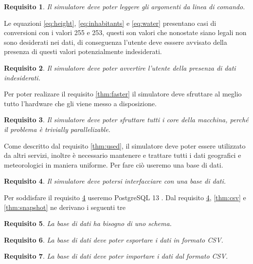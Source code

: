 \documentclass[draft]{article}
\newcommand{\eng}[1]{\foreignlanguage{english}{#1}} %
\newtheorem{requirement}{Requisito}
\begin{document}
\begin{requirement}
Il simulatore deve poter leggere gli argomenti da linea di comando.
\end{requirement}

Le equazioni \ref{eq:height}, \ref{eq:inhabitants} e \ref{eq:water} presentano
casi di conversioni con i valori 255 e 253, questi son valori che nonostate
siano legali non sono desiderati nei dati, di conseguenza l'utente deve esssere
avvisato della presenza di questi valori potenzialmente indesiderati.

\begin{requirement}
Il simulatore deve poter avvertire l'utente della presenza di dati indesiderati.
\end{requirement}

Per poter realizare il requisito \ref{thm:faster} il simulatore deve sfruttare
al meglio tutto l'\eng{hardware} che gli viene messo a disposizione.

\begin{requirement}\label{thm:multicore}
Il simulatore deve poter sfruttare tutti i \eng{core} della macchina, perché il
problema è \eng{trivially parallelizable}.
\end{requirement}

Come descritto dal requisito \ref{thm:used}, il simulatore deve poter essere
utilizzato da altri servizi, inoltre è necessario mantenere e trattare tutti i
dati geografici e meteorologici in maniera uniforme. Per fare ciò useremo una
base di dati.

\begin{requirement}\label{thm:db}
Il simulatore deve potersi interfacciare con una base di dati.
\end{requirement}

Per soddisfare il requisito \ref{thm:db} useremo PostgreSQL 13 \cite{psql}. Dal
requisito \ref{thm:db}, \ref{thm:csv} e \ref{thm:snapshot} ne derivano i
seguenti tre

\begin{requirement}
La base di dati ha bisogno di uno schema.
\end{requirement}

\begin{requirement}\label{thm:export}
La base di dati deve poter esportare i dati in formato CSV.
\end{requirement}

\begin{requirement}\label{thm:import}
La base di dati deve poter importare i dati dal formato CSV.
\end{requirement}
\end{document}
